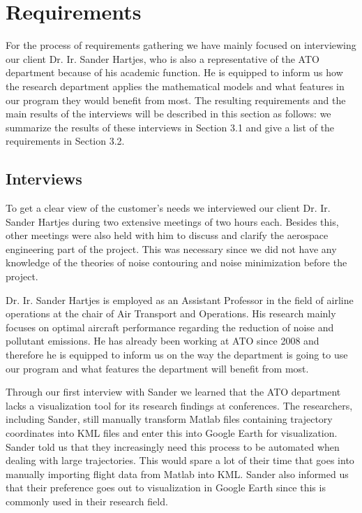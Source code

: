 \section{Requirements}
For the process of requirements gathering we have mainly focused on interviewing our client Dr. Ir. Sander Hartjes, who is also a representative of the ATO department because of his academic function. He is equipped to inform us how the research department applies the mathematical models and what features in our program they would benefit from most. The resulting requirements and the main results of the interviews will be described in this section as follows: we summarize the results of these interviews in Section 3.1 and give a list of the requirements in Section 3.2. 

\subsection{Interviews}

To get a clear view of the customer's needs we interviewed our client Dr. Ir. Sander Hartjes during two extensive meetings of two hours each. Besides this, other meetings were also held with him to discuss and clarify the aerospace engineering part of the project. This was necessary since we did not have any knowledge of the theories of noise contouring and noise minimization before the project. 

Dr. Ir. Sander Hartjes is employed as an Assistant Professor in the field of airline operations at the chair of Air Transport and Operations. His research mainly focuses on optimal aircraft performance regarding the reduction of noise and pollutant emissions. He has already been working at ATO since 2008 and therefore he is equipped to inform us on the way the department is going to use our program and what features the department will benefit from most.

Through our first interview with Sander we learned that the ATO department lacks a visualization tool for its research findings at conferences. The researchers, including Sander, still manually transform Matlab files containing trajectory coordinates into KML files and enter this into Google Earth for visualization. Sander told us that they increasingly need this process to be automated when dealing with large trajectories. This would spare a lot of their time that goes into manually importing flight data from Matlab into KML. Sander also informed us that their preference goes out to visualization in Google Earth since this is commonly used in their research field.

